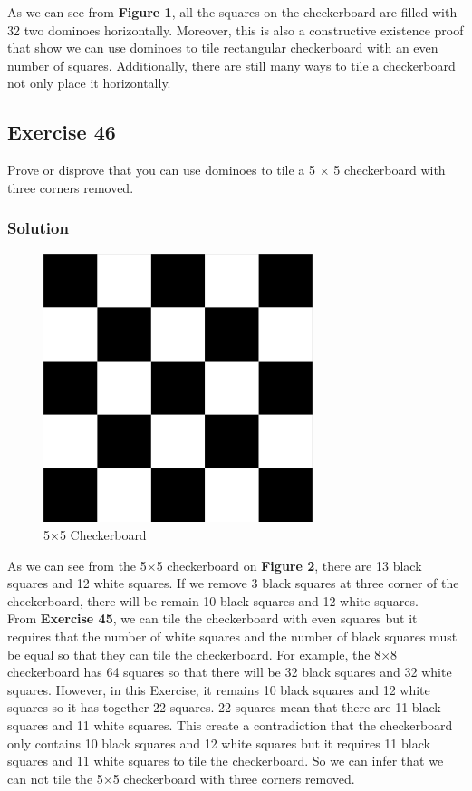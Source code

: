 \documentclass{article}
\begin{document}
As we can see from \textbf{Figure 1}, all the squares on the checkerboard are filled with 32 two dominoes horizontally. Moreover, this is also a constructive existence proof that show we can use dominoes to tile rectangular checkerboard
with an even number of squares. Additionally, there are still many ways to tile a checkerboard
not only place it horizontally.
\subsection*{Exercise 46}
Prove or disprove that you can use dominoes to tile a 5 $\times$ 5 checkerboard with three corners removed.
\subsubsection*{Solution}
\clearpage
\begin{figure}
    \begin{center}
        \includegraphics[width = 0.7\textwidth]{5x5Checkerboard-01.png}
    \end{center}
    \caption{5$\times$5 Checkerboard}
\end{figure}
As we can see from the 5$\times$5 checkerboard on \textbf{Figure 2}, there are 13 black squares
and 12 white squares. If we remove 3 black squares at three corner of the checkerboard,
there will be remain 10 black squares and 12 white squares. \\

From \textbf{Exercise 45}, we can tile the checkerboard with even squares but it requires that the number of white squares
and the number of black squares must be equal so that they can tile the checkerboard. For example,
the 8$\times$8 checkerboard has 64 squares so that there will be 32 black squares and 32 white squares.
However, in this Exercise, it remains 10 black squares and 12 white squares
so it has together 22 squares. 22 squares mean that there are 11 black squares
and 11 white squares. This create a contradiction that the checkerboard only contains
10 black squares and 12 white squares but it requires 11 black squares and 11
white squares to tile the checkerboard. So we can infer that we can not tile the 5$\times$5
checkerboard with three corners removed.
\end{document}

